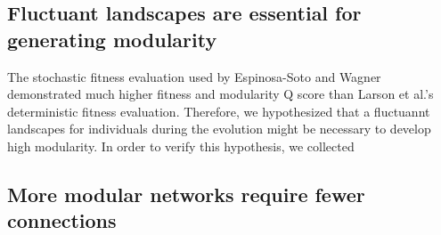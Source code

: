 \subsection{Fluctuant  landscapes are essential for generating modularity}
The stochastic fitness evaluation used by Espinosa-Soto and Wagner \cite{espinosa2010specialization} demonstrated much higher fitness and modularity Q score than Larson et al.'s deterministic fitness evaluation. Therefore, we hypothesized that a fluctuannt landscapes for individuals during the evolution might be necessary to develop high modularity. In order to verify this hypothesis, we collected 

\subsection{More modular networks require fewer connections}